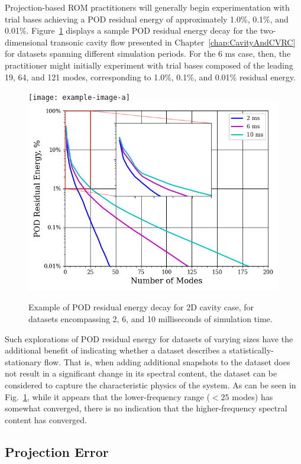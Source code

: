 Projection-based ROM practitioners will generally begin experimentation with trial bases achieving a POD residual energy of approximately 1.0\%, 0.1\%, and 0.01\%. Figure~\ref{fig:samplePODEnergy} displays a sample POD residual energy decay for the two-dimensional transonic cavity flow presented in Chapter~\ref{chap:CavityAndCVRC} for datasets spanning different simulation periods. For the 6 ms case, then, the practitioner might initially experiment with trial bases composed of the leading 19, 64, and 121 modes, corresponding to 1.0\%, 0.1\%, and 0.01\% residual energy.

\begin{figure}
	\centering
    \ifdefined\DRAFT
		\texttt{[image: example-image-a]}
	\else
	    \includegraphics[width=0.6\linewidth]{Chapters/ProjROMs/Images/pod_energy_2dCavity_example.png}
    \fi
	\caption{\label{fig:samplePODEnergy}Example of POD residual energy decay for 2D cavity case, for datasets encompassing 2, 6, and 10 milliseconds of simulation time.}
\end{figure}

Such explorations of POD residual energy for datasets of varying sizes have the additional benefit of indicating whether a dataset describes a statistically-stationary flow. That is, when adding additional snapshots to the dataset does not result in a significant change in its spectral content, the dataset can be considered to capture the characteristic physics of the system. As can be seen in Fig.~\ref{fig:samplePODEnergy}, while it appears that the lower-frequency range ($< 25$ modes) has somewhat converged, there is no indication that the higher-frequency spectral content has converged.

\subsection{Projection Error}\label{subsec:projError}

